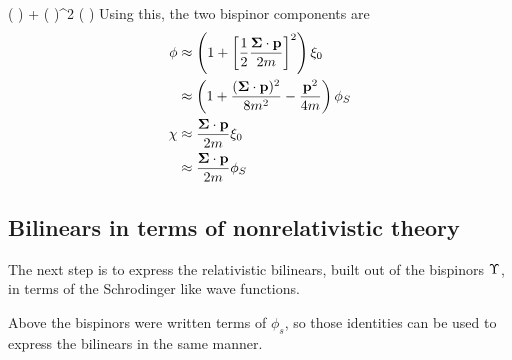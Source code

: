 \beq
	\cosh( ) 
		 + \left(  \right)^2
\eeq
\beq
	\sinh( ) 
		\approx   {}
\eeq
Using this, the two bispinor components are
\begin{align}
\phi 
	&\approx  \left(  1 + \left[ \frac{1}{2}\frac{\mbox{\boldmath$ \Sigma $} \cdot \mathbf{p} }{2m} \right]^2 \right) \xi_0 \notag \\
	&\approx  \left(  1 + \frac{(\mbox{\boldmath$ \Sigma $} \cdot \mathbf{p})^2 }{8m^2} - \frac{\mathbf{p}^2}{4m} \right ) \phi_S	 \label{eq:nrPhi} \\
 \chi
 	&\approx	\frac{\mbox{\boldmath$ \Sigma $} \cdot \mathbf{p} }{2m} \xi_0 \notag \\
 	&\approx	\frac{\mbox{\boldmath$ \Sigma $} \cdot \mathbf{p} }{2m} \phi_S  \label{eq:nrChi}
\end{align}




\subsection{Bilinears in terms of nonrelativistic theory}
The next step is to express the relativistic bilinears, built out of the bispinors $\Upsilon$, in terms of the Schrodinger like wave functions.

Above the bispinors were written terms of $\phi_s$, so those identities can be used to express the bilinears in the same manner.  


